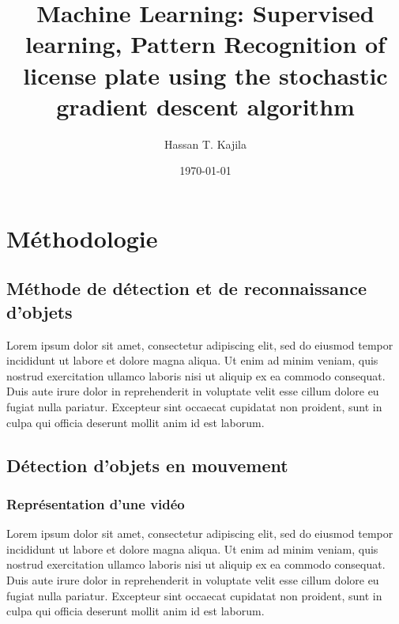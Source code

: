 \documentclass[12pt,a4paper,twoside]{report}
\title{Machine Learning: Supervised learning, Pattern Recognition of license plate 
	using the stochastic gradient descent algorithm}
\author{Hassan T. Kajila}
\date{\today}
\begin{document}
	
	
	
	
	
	
	\setcounter{page}{1}
	
	
	
	
	
	
	\begin{singlespace}
	\tableofcontents %
	\end{singlespace}
	
	
	\setcounter{page}{1}
	
	
	
	\chapter{Méthodologie}
		
		\section{Méthode de détection et de reconnaissance d'objets}
			Lorem ipsum dolor sit amet, consectetur adipiscing elit, sed do eiusmod tempor incididunt ut labore et dolore magna aliqua. Ut enim ad minim veniam, quis nostrud exercitation ullamco laboris nisi ut aliquip ex ea commodo consequat. Duis aute irure dolor in reprehenderit in voluptate velit esse cillum dolore eu fugiat nulla pariatur. Excepteur sint occaecat cupidatat non proident, sunt in culpa qui officia deserunt mollit anim id est laborum.
			
		\section{Détection d'objets en mouvement}
		\subsection{Représentation d'une vidéo}
			Lorem ipsum dolor sit amet, consectetur adipiscing elit, sed do eiusmod tempor incididunt ut labore et dolore magna aliqua. Ut enim ad minim veniam, quis nostrud exercitation ullamco laboris nisi ut aliquip ex ea commodo consequat. Duis aute irure dolor in reprehenderit in voluptate velit esse cillum dolore eu fugiat nulla pariatur. Excepteur sint occaecat cupidatat non proident, sunt in culpa qui officia deserunt mollit anim id est laborum.
		
\end{document}
